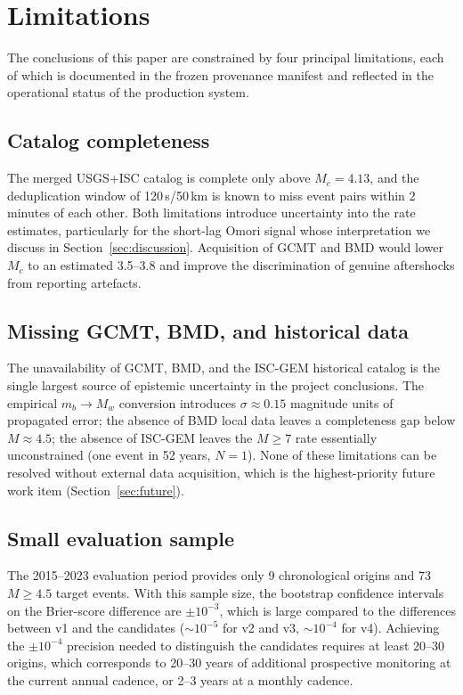 \documentclass[10pt,a4paper,twocolumn]{article}
\begin{document}
\section{Limitations}\label{sec:limitations}

The conclusions of this paper are constrained by four principal limitations, each of which is documented in the frozen provenance manifest and reflected in the operational status of the production system.

\subsection{Catalog completeness}

The merged USGS+ISC catalog is complete only above $M_c=4.13$, and the deduplication window of 120\,s/50\,km is known to miss event pairs within 2 minutes of each other. Both limitations introduce uncertainty into the rate estimates, particularly for the short-lag Omori signal whose interpretation we discuss in Section~\ref{sec:discussion}. Acquisition of GCMT and BMD would lower $M_c$ to an estimated 3.5--3.8 and improve the discrimination of genuine aftershocks from reporting artefacts.

\subsection{Missing GCMT, BMD, and historical data}

The unavailability of GCMT, BMD, and the ISC-GEM historical catalog is the single largest source of epistemic uncertainty in the project conclusions. The empirical $m_b\to M_w$ conversion introduces $\sigma\approx0.15$ magnitude units of propagated error; the absence of BMD local data leaves a completeness gap below $M\approx4.5$; the absence of ISC-GEM leaves the $M\geq7$ rate essentially unconstrained (one event in 52 years, $N=1$). None of these limitations can be resolved without external data acquisition, which is the highest-priority future work item (Section~\ref{sec:future}).

\subsection{Small evaluation sample}

The 2015--2023 evaluation period provides only 9 chronological origins and 73 $M\geq4.5$ target events. With this sample size, the bootstrap confidence intervals on the Brier-score difference are $\pm10^{-3}$, which is large compared to the differences between v1 and the candidates ($\sim10^{-5}$ for v2 and v3, $\sim10^{-4}$ for v4). Achieving the $\pm10^{-4}$ precision needed to distinguish the candidates requires at least 20--30 origins, which corresponds to 20--30 years of additional prospective monitoring at the current annual cadence, or 2--3 years at a monthly cadence.
\end{document}
